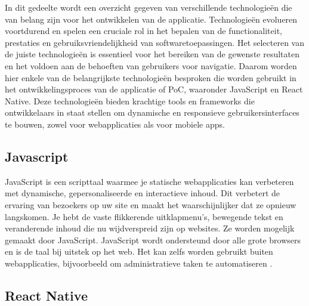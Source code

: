 
In dit gedeelte wordt een overzicht gegeven van verschillende technologieën die van belang zijn voor het ontwikkelen van de applicatie. Technologieën evolueren voortdurend en spelen een cruciale rol in het bepalen van de functionaliteit, prestaties en gebruiksvriendelijkheid van softwaretoepassingen. Het selecteren van de juiste technologieën is essentieel voor het bereiken van de gewenste resultaten en het voldoen aan de behoeften van gebruikers voor navigatie. Daarom worden hier enkele van de belangrijkste technologieën besproken die worden gebruikt in het ontwikkelingsproces van de applicatie of PoC, waaronder JavaScript en React Native. Deze technologieën bieden krachtige tools en frameworks die ontwikkelaars in staat stellen om dynamische en responsieve gebruikersinterfaces te bouwen, zowel voor webapplicaties als voor mobiele apps.

\subsection{Javascript}
\label{sec:javascript}


JavaScript is een scripttaal waarmee je statische webapplicaties kan verbeteren met dynamische, gepersonaliseerde en interactieve inhoud. Dit verbetert de ervaring van bezoekers op uw site en maakt het waarschijnlijker dat ze opnieuw langskomen. Je hebt de vaste flikkerende uitklapmenu's, bewegende tekst en veranderende inhoud die nu wijdverspreid zijn op websites. Ze worden mogelijk gemaakt door JavaScript. JavaScript wordt ondersteund door alle grote browsers en is de taal bij uitstek op het web. Het kan zelfs worden gebruikt buiten webapplicaties, bijvoorbeeld om administratieve taken te automatiseren \autocite{Wilton2004}.

\subsection{React Native}
\label{sec:react native}

